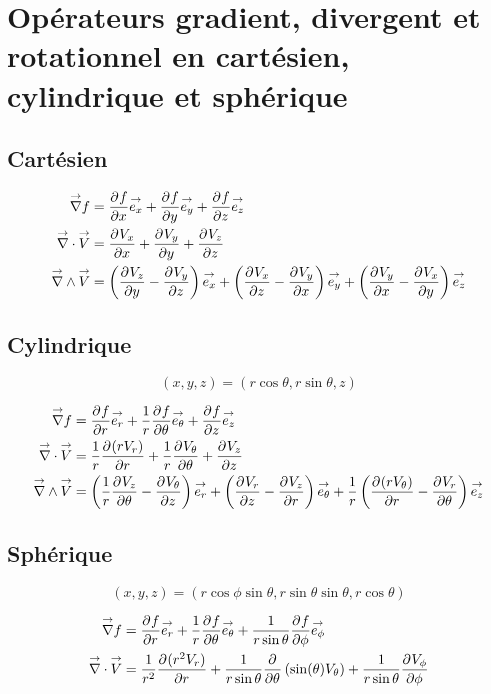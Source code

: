 \section{Opérateurs gradient, divergent et rotationnel en cartésien, cylindrique et sphérique}
\label{sec:annexe:div_grad_rot}
\subsection{Cartésien}

    \begin{align}
        \vgrad f &= \ddr{x}{f}\vect{e_x} + \ddr{y}{f}\vect{e_y}  + \ddr{z}{f}\vect{e_z} \\
        \vdiv \vect{V} &= \ddr{x}{V_x} + \ddr{y}{V_y} + \ddr{z}{V_z} \\
        \vrot\vect{V} &= \left(\ddr{y}{V_z}-\ddr{z}{V_y}\right)\vect{e_x} + \left(\ddr{z}{V_x}-\ddr{x}{V_y}\right)\vect{e_y} + \left(\ddr{x}{V_y}-\ddr{y}{V_x}\right)\vect{e_z}
    \end{align}

\subsection{Cylindrique}

    \[
        (x,y,z) = (r\cos\theta,r\sin\theta,z)
    \]

    \begin{align}
        \vgrad f &= \ddr{r}{f}\vect{e_r}
        +\frac{1}{r}\ddr{\theta}{f}\vect{e_\theta} + \ddr{z}{f}\vect{e_z}
        \\
        \vdiv \vect{V} &= \frac{1}{r}\ddr{r}{(rV_r)}+\frac{1}{r}\ddr{\theta}{V_\theta}+\ddr{z}{V_z}
        \\
        \vrot \vect{V} &= \left(\frac{1}{r}\ddr{\theta}{V_z} - \ddr{z}{V_\theta}\right)\vect{e_r} +
        \left(\ddr{z}{V_r} - \ddr{r}{V_z}\right)\vect{e_\theta} +
        \frac{1}{r}\left(\ddr{r}{(rV_\theta)}-\ddr{\theta}{V_r}\right)\vect{e_z}
    \end{align}

\subsection{Sphérique}

    \[
        (x,y,z) = (r\cos\phi\sin\theta,r\sin\theta\sin\theta,r\cos\theta)
    \]

    \begin{align}
        \vgrad f &= \ddr{r}{f}\vect{e_r}
        +\frac{1}{r}\ddr{\theta}{f}\vect{e_\theta} + \frac{1}{r\sin\theta}\ddr{\phi}{f}\vect{e_\phi}
        \\
        \vdiv \vect{V} &= \frac{1}{r^2}\ddr{r}{(r^2V_r)}
        + \frac{1}{r\sin\theta}\ddr{\theta}{}\left(\sin(\theta)V_\theta\right) + \frac{1}{r\sin\theta}\ddr{\phi}{V_\phi}
    \end{align}

